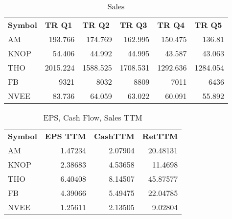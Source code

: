 \documentclass{article}
\begin{document}
\begin{table}[htbp]
  \centering
  \caption{Sales}
    \begin{tabular}{lrrrrr}
    \textbf{Symbol} & \multicolumn{1}{l}{\textbf{TR Q1}} & \multicolumn{1}{l}{\textbf{TR Q2}} & \multicolumn{1}{l}{\textbf{TR Q3}} & \multicolumn{1}{l}{\textbf{TR Q4}} & \multicolumn{1}{l}{\textbf{TR Q5}} \\
    AM    & 193.766 & 174.769 & 162.995 & 150.475 & 136.81 \\
    KNOP  & 54.406 & 44.992 & 44.995 & 43.587 & 43.063 \\
    THO   & 2015.224 & 1588.525 & 1708.531 & 1292.636 & 1284.054 \\
    FB    & 9321  & 8032  & 8809  & 7011  & 6436 \\
    NVEE  & 83.736 & 64.059 & 63.022 & 60.091 & 55.892 \\
    \end{tabular}%
  \label{tab:addlabel}%
\end{table}%

\begin{table}[htbp]
  \centering
  \caption{EPS, Cash Flow, Sales TTM}
    \begin{tabular}{lrrr}
    \multicolumn{1}{p{4.215em}}{\textbf{Symbol}} & \multicolumn{1}{p{4.215em}}{\textbf{EPS TTM}} & \multicolumn{1}{p{4.215em}}{\textbf{CashTTM}} & \multicolumn{1}{p{4.215em}}{\textbf{RetTTM}} \\
    AM    & 1.47234 & 2.07904 & 20.48131 \\
    KNOP  & 2.38683 & 4.53658 & 11.4698 \\
    THO   & 6.40408 & 8.14507 & 45.87577 \\
    FB    & 4.39066 & 5.49475 & 22.04785 \\
    NVEE  & 1.25611 & 2.13505 & 9.02804 \\
    \end{tabular}%
  \label{tab:addlabel}%
\end{table}%
\end{document}
